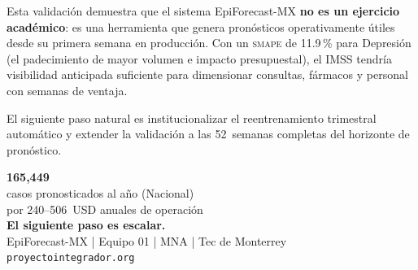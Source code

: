 \documentclass[12pt, letterpaper]{article}
\newcommand{\smape}{\textnormal{\textsc{smape}}}
\begin{document}
\smallskip

Esta validación demuestra que el sistema EpiForecast-MX \textbf{no es un ejercicio académico}: es una herramienta que genera pronósticos operativamente útiles desde su primera semana en producción. Con un \smape{} de 11.9\,\% para Depresión (el padecimiento de mayor volumen e impacto presupuestal), el IMSS tendría visibilidad anticipada suficiente para dimensionar consultas, fármacos y personal con semanas de ventaja.

El siguiente paso natural es institucionalizar el reentrenamiento trimestral automático y extender la validación a las 52~semanas completas del horizonte de pronóstico.

\newpage
\thispagestyle{empty}


\vspace*{\fill}

\begin{center}
{\color{white}\fontsize{40}{48}\selectfont\bfseries 165,449}\\[0.3cm]
{\color{gold}\fontsize{16}{22}\selectfont casos pronosticados al año (Nacional)}\\[0.3cm]
{\color{white!80}\large por 240--506~USD anuales de operación}\\[2cm]
{\color{white}\fontsize{20}{26}\selectfont\bfseries El siguiente paso es escalar.}\\[1.5cm]
{\color{white!70}\large EpiForecast-MX | Equipo 01 | MNA | Tec de Monterrey}\\[0.5cm]
{\color{gold}\large\texttt{proyectointegrador.org}}\\
\end{center}

\vspace*{\fill}

\end{document}
